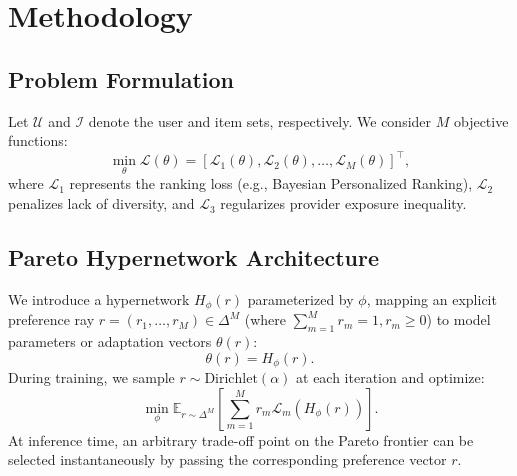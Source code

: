 \section{Methodology}
\label{sec:method}

\subsection{Problem Formulation}
Let $\mathcal{U}$ and $\mathcal{I}$ denote the user and item sets, respectively. We consider $M$ objective functions:
\begin{equation}
    \min_{\theta} \mathcal{L}(\theta) = \left[ \mathcal{L}_1(\theta), \mathcal{L}_2(\theta), \dots, \mathcal{L}_M(\theta) \right]^\top,
\end{equation}
where $\mathcal{L}_1$ represents the ranking loss (e.g., Bayesian Personalized Ranking), $\mathcal{L}_2$ penalizes lack of diversity, and $\mathcal{L}_3$ regularizes provider exposure inequality.

\subsection{Pareto Hypernetwork Architecture}
We introduce a hypernetwork $H_\phi(r)$ parameterized by $\phi$, mapping an explicit preference ray $r = (r_1, \dots, r_M) \in \Delta^M$ (where $\sum_{m=1}^M r_m = 1, r_m \ge 0$) to model parameters or adaptation vectors $\theta(r)$:
\begin{equation}
    \theta(r) = H_\phi(r).
\end{equation}
During training, we sample $r \sim \text{Dirichlet}(\alpha)$ at each iteration and optimize:
\begin{equation}
    \min_{\phi} \mathbb{E}_{r \sim \Delta^M} \left[ \sum_{m=1}^M r_m \mathcal{L}_m(H_\phi(r)) \right].
\end{equation}
At inference time, an arbitrary trade-off point on the Pareto frontier can be selected instantaneously by passing the corresponding preference vector $r$.
